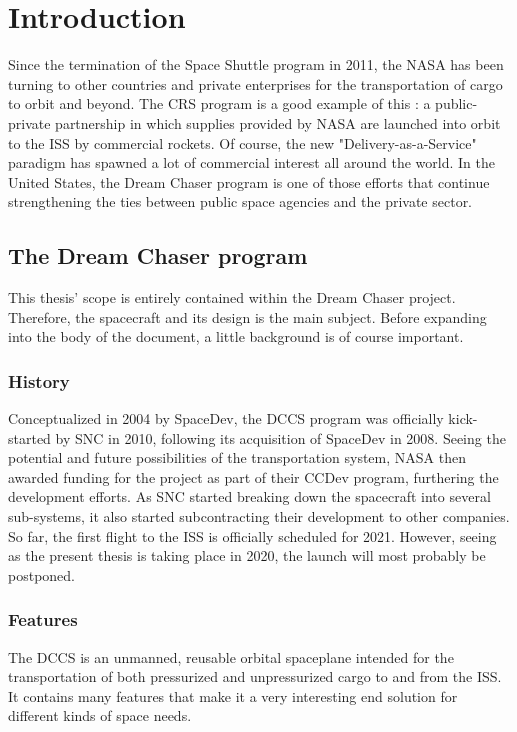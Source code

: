 {
\setlength{\parindent}{2em}
\chapter{Introduction}\label{cha:intro}
Since the termination of the Space Shuttle program in 2011, the \gls{NASA} has been turning to other countries and private enterprises for the transportation of cargo to orbit and beyond. The \gls{CRS} program is a good example of this : a public-private partnership in which supplies provided by NASA are launched into orbit to the \gls{ISS} by commercial rockets. Of course, the new "Delivery-as-a-Service" paradigm has spawned a lot of commercial interest all around the world. In the United States, the Dream Chaser program is one of those efforts that continue strengthening the ties between public space agencies and the private sector.

\section{The Dream Chaser program}
This thesis' scope is entirely contained within the Dream Chaser project. Therefore, the spacecraft and its design is the main subject. Before expanding into the body of the document, a little background is of course important.
\subsection{History}
Conceptualized in 2004 by SpaceDev, the \gls{DCCS} program was officially kick-started by \gls{SNC} in 2010, following its acquisition of SpaceDev in 2008\cite{online:fikes}. Seeing the potential and future possibilities of the transportation system, NASA then awarded funding for the project as part of their \gls{CCDev} program, furthering the development efforts. As \gls{SNC} started breaking down the spacecraft into several sub-systems, it also started subcontracting their development to other companies. So far, the first flight to the \gls{ISS} is officially scheduled for 2021. However, seeing as the present thesis is taking place in 2020, the launch will most probably be postponed.

\subsection{Features}
The \gls{DCCS} is an unmanned, reusable orbital spaceplane intended for the transportation of both pressurized and unpressurized cargo to and from the \gls{ISS}. It contains many features that make it a very interesting end solution for different kinds of space needs. 

}
